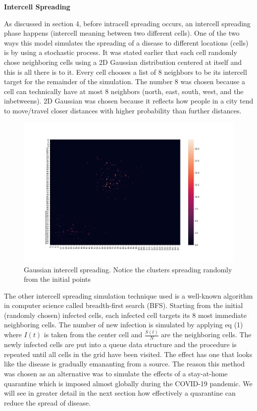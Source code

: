 \documentclass[a4paper]{article}
\begin{document}
\bigskip

\textbf{Intercell Spreading}

As discussed in section 4, before intracell spreading occurs, an intercell
spreading phase happens (intercell meaning between two different cells).
One of the two ways this model simulates the spreading of a disease to different locations
(cells) is by using a stochastic process. It was stated earlier that each cell 
randomly chose neighboring cells using a 2D Gaussian distribution centered at itself 
and this is all there is to it. Every cell chooses a list of 8 neighbors to be 
its intercell target for the remainder of the simulation. The number 8 was 
chosen because a cell can technically have at most 8 neighbors (north, east, 
south, west, and the inbetweens). 2D Gaussian was chosen because it reflects how 
people in a city tend to move/travel closer distances with higher probability than further 
distances.

\begin{figure}[ht]
  \includegraphics[scale=0.25]{../gaussian_spread/gaussian_spread_1.png}
  \centering
  \caption{Gaussian intercell spreading. Notice the clusters spreading randomly from
  the initial points}
\end{figure}

The other intercell spreading simulation technique used is a well-known algorithm 
in computer science called breadth-first search (BFS). Starting from the initial
(randomly chosen) infected cells, each infected cell targets its 8 most
immediate neighboring cells. The number of new infection is simulated by applying eq
(1) where $I(t)$ is taken from the center cell and $\frac{S(t)}{N}$ are the neighboring
cells. The newly infected cells are put into a queue data structure and the procedure is
repeated until all cells in the grid have been visited. The effect has one that
looks like the disease is gradually emananting from a source. The reason this
method was chosen as an alternative was to simulate the effects of a
stay-at-home quarantine which is imposed almost globally during the COVID-19
pandemic. We will see in greater detail in the next section how effectively a
quarantine can reduce the spread of disease.
\end{document}
